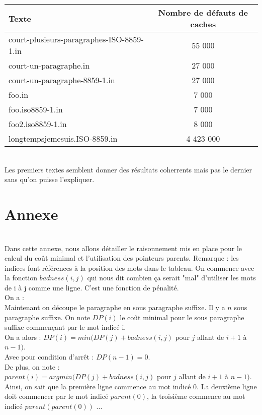 \documentclass{article}
\begin{document}
\begin{tabular}{|l|c|}
  \hline
  Texte & Nombre de d\'efauts de caches \\
  \hline
  court-plusieurs-paragraphes-ISO-8859-1.in &  55 000\\
  court-un-paragraphe.in & 27 000 \\
  court-un-paragraphe-8859-1.in & 27 000\\
  foo.in & 7 000\\
  foo.iso8859-1.in & 7 000 \\
  foo2.iso8859-1.in & 8 000 \\
  longtempsjemesuis.ISO-8859.in & 4 423 000 \\
  \hline
\end{tabular}  
\\
Les premiers textes semblent donner des r\'esultats coherrents mais pas le dernier sans qu'on puisse l'expliquer.

\section{Annexe}
\\
Dans cette annexe, nous allons détailler le raisonnement mis en place pour le calcul du co\^ut minimal et l'utilisation des pointeurs parents. Remarque : les indices font r\'ef\'erences à la position des mots dans le tableau.
On commence avec la fonction $badness(i, j)$ qui nous dit combien ça serait "mal" d'utiliser les mots de i à j comme une ligne. C'est une fonction de p\'enalité. \\
On a : \\
% 
Maintenant on découpe le paragraphe en sous paragraphe suffixe. Il y a $n$ sous paragraphe suffixe. On note $DP(i)$ le coût minimal pour le sous paragraphe suffixe commençant par le mot indicé i. \\ On a alors : 
$DP(i) = min( DP(j) + badness(i, j) $ pour $j$ allant de $i+1 $ à $ n - 1)$. \\ Avec pour condition d'arrêt : $DP(n-1) = 0$. \\
De plus, on note : \\
$parent(i) = argmin ( DP(j) + badness(i, j) $ pour $j$ allant de $i+1 $ à $ n - 1)$. \\
Ainsi, on sait que la première ligne commence au mot indicé 0. La deuxième ligne doit commencer par le mot indicé $parent(0)$, la troisième commence au mot indicé $parent(parent(0))$ ... \\ 
\end{document}
